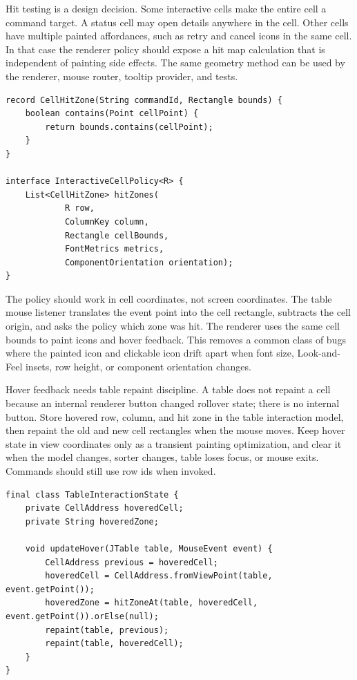 Hit testing is a design decision. Some interactive cells make the entire cell a
command target. A status cell may open details anywhere in the cell. Other cells
have multiple painted affordances, such as retry and cancel icons in the same
cell. In that case the renderer policy should expose a hit map calculation that
is independent of painting side effects. The same geometry method can be used by
the renderer, mouse router, tooltip provider, and tests.

\begin{lstlisting}[caption={A cell interaction policy computes hit zones from cell geometry.}]
record CellHitZone(String commandId, Rectangle bounds) {
    boolean contains(Point cellPoint) {
        return bounds.contains(cellPoint);
    }
}

interface InteractiveCellPolicy<R> {
    List<CellHitZone> hitZones(
            R row,
            ColumnKey column,
            Rectangle cellBounds,
            FontMetrics metrics,
            ComponentOrientation orientation);
}
\end{lstlisting}

The policy should work in cell coordinates, not screen coordinates. The table
mouse listener translates the event point into the cell rectangle, subtracts the
cell origin, and asks the policy which zone was hit. The renderer uses the same
cell bounds to paint icons and hover feedback. This removes a common class of
bugs where the painted icon and clickable icon drift apart when font size,
Look-and-Feel insets, row height, or component orientation changes.

Hover feedback needs table repaint discipline. A table does not repaint a cell
because an internal renderer button changed rollover state; there is no internal
button. Store hovered row, column, and hit zone in the table interaction model,
then repaint the old and new cell rectangles when the mouse moves. Keep hover
state in view coordinates only as a transient painting optimization, and clear
it when the model changes, sorter changes, table loses focus, or mouse exits.
Commands should still use row ids when invoked.

\begin{lstlisting}[caption={Hover state is transient view state; command state is model state.}]
final class TableInteractionState {
    private CellAddress hoveredCell;
    private String hoveredZone;

    void updateHover(JTable table, MouseEvent event) {
        CellAddress previous = hoveredCell;
        hoveredCell = CellAddress.fromViewPoint(table, event.getPoint());
        hoveredZone = hitZoneAt(table, hoveredCell, event.getPoint()).orElse(null);
        repaint(table, previous);
        repaint(table, hoveredCell);
    }
}
\end{lstlisting}


